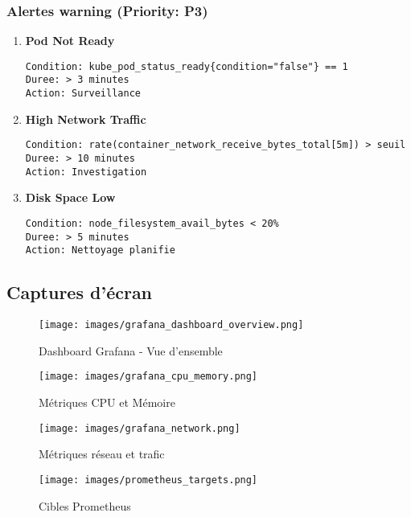 \documentclass[12pt,a4paper]{article}
\begin{document}
\subsubsection{Alertes warning (Priority: P3)}

\begin{enumerate}
    \item \textbf{Pod Not Ready}
    \begin{lstlisting}
Condition: kube_pod_status_ready{condition="false"} == 1
Duree: > 3 minutes
Action: Surveillance
    \end{lstlisting}
    
    \item \textbf{High Network Traffic}
    \begin{lstlisting}
Condition: rate(container_network_receive_bytes_total[5m]) > seuil
Duree: > 10 minutes
Action: Investigation
    \end{lstlisting}
    
    \item \textbf{Disk Space Low}
    \begin{lstlisting}
Condition: node_filesystem_avail_bytes < 20%
Duree: > 5 minutes
Action: Nettoyage planifie
    \end{lstlisting}
\end{enumerate}

\subsection{Captures d'écran}

\begin{figure}[H]
    \centering
    \texttt{[image: images/grafana\_dashboard\_overview.png]}
    \caption{Dashboard Grafana - Vue d'ensemble}
    \label{fig:grafana_overview}
\end{figure}

\begin{figure}[H]
    \centering
    \texttt{[image: images/grafana\_cpu\_memory.png]}
    \caption{Métriques CPU et Mémoire}
    \label{fig:grafana_cpu}
\end{figure}

\begin{figure}[H]
    \centering
    \texttt{[image: images/grafana\_network.png]}
    \caption{Métriques réseau et trafic}
    \label{fig:grafana_network}
\end{figure}

\begin{figure}[H]
    \centering
    \texttt{[image: images/prometheus\_targets.png]}
    \caption{Cibles Prometheus}
    \label{fig:prometheus_targets}
\end{figure}
\end{document}
